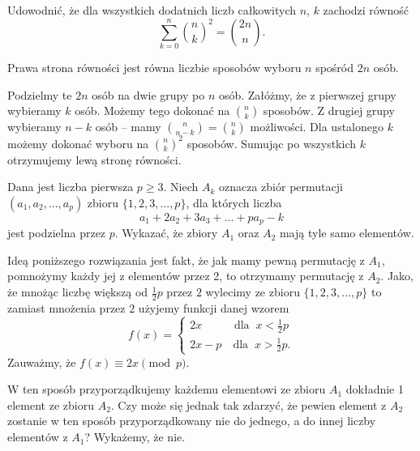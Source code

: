 \newpage

\begin{problem}{3} 
	Udowodnić, że dla wszystkich dodatnich liczb całkowitych $n$, $k$ zachodzi równość
	\[
	    \sum^{n}_{k=0} {{n}\choose{k}}^2 = {{2n}\choose{n}}.
	\]
\end{problem}

\vspace{5px}

\noindent
Prawa strona równości jest równa liczbie sposobów wyboru $n$ spośród $2n$ osób.
\vspace{10px}

\noindent
Podzielmy te $2n$ osób na dwie grupy po $n$ osób. Załóżmy, że z pierwszej grupy wybieramy $k$ osób. Możemy tego dokonać na ${n}\choose{k}$ sposobów. Z drugiej grupy wybieramy $n - k$ osób -- mamy ${{n}\choose{n - k}} = {{n}\choose{k}}$ możliwości. Dla ustalonego $k$ możemy dokonać wyboru na ${{n}\choose{k}}^2$ sposobów. Sumując po wszystkich $k$ otrzymujemy lewą stronę równości.

\begin{problem}{4}
	Dana jest liczba pierwsza $p \geqslant 3$. Niech $A_k$ oznacza zbiór permutacji $(a_1, a_2, ..., a_p)$ zbioru $\{1, 2, 3,..., p\}$, dla których liczba
	\[
		a_1 + 2a_2 + 3a_3 + ... + pa_p - k
	\]
	jest podzielna przez $p$. Wykazać, że zbiory $A_1$ oraz $A_2$ mają tyle samo elementów.
\end{problem}

\vspace{5px}

\noindent
Ideą poniższego rozwiązania jest fakt, że jak mamy pewną permutację z $A_1$, pomnożymy każdy jej z elementów przez 2, to otrzymamy permutację z $A_2$. Jako, że mnożąc liczbę większą od $\frac{1}{2}p$ przez $2$ wylecimy ze zbioru $\{1, 2, 3,..., p\}$ to zamiast mnożenia przez $2$ użyjemy funkcji danej wzorem
\[
	f(x) = 
	\begin{cases}
	2x \;\;\; \quad\quad\text{dla} \;\; x < \frac{1}{2}p\\
	2x - p \quad \text{dla} \;\; x > \frac{1}{2}p.
	\end{cases}
\]
Zauważmy, że $f(x) \equiv 2x \pmod{p}$.
\vspace{10px}

\noindent
W ten sposób przyporządkujemy każdemu elementowi ze zbioru $A_1$ dokładnie 1 element ze zbioru $A_2$. Czy może się jednak tak zdarzyć, że pewien element z $A_2$ zostanie w ten sposób przyporządkowany nie do jednego, a do innej liczby elementów z $A_1$? Wykażemy, że nie.
\vspace{10px}

